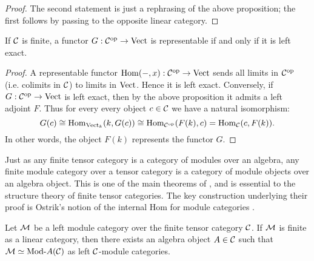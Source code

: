 \documentclass{amsart}
\begin{document}
\begin{proof}
	The second statement is just a rephrasing of the above proposition; the first follows by passing to the opposite linear category.  
\end{proof}


\begin{corollary}
If $\mathcal C$ is finite, a functor $G: \mathcal C^\textrm{op} \to \mathrm{Vect}$ is representable if and only if it is left exact. 
\end{corollary}

\begin{proof}
	A representable functor $\operatorname{Hom}(-, x):\mathcal C^\text{op} \to \mathrm{Vect}$ sends all limits in $\mathcal C^\text{op}$ (i.e. colimits in $\mathcal C$) to limits in $\mathrm{Vect}$. Hence it is left exact. 
%
%		
Conversely, if $G: \mathcal C^\text{op} \to \mathrm{Vect}$ is left exact, then by the above proposition it admits a left adjoint $F$. Thus for every every object $c \in \mathcal C$ we have a natural isomorphism:
	\begin{equation*}
		G(c) \cong \operatorname{Hom}_{\mathrm{Vect}_k}( k, G(c)) \cong \operatorname{Hom}_{\mathcal C^{\mathrm{op}}}( F(k), c) = \operatorname{Hom}_{\mathcal C}(c, F(k) ).
	\end{equation*}
	In other words,  the object $F(k)$ represents the functor $G$. 
\end{proof}

Just as any finite tensor category is a category of modules over an algebra, any finite module category over a tensor category is a category of module objects over an algebra object.  This is one of the main theorems of \cite{EGNO}, and is essential to the structure theory of finite tensor categories.  The key construction underlying their proof is Ostrik's notion of the internal Hom for module categories \cite{MR1976459}.

\begin{theorem} \label{thm:EGNO2.11.6} %
	Let $\mathcal M$ be a left module category over the finite tensor category $\mathcal C$. If $\mathcal M$ is finite as a linear category, then there exists an algebra object $A \in \mathcal C$ such that $\cM \simeq \Mod{}{A} (\cC)$ as left $\mathcal C$-module categories. 
\end{theorem}
\end{document}
